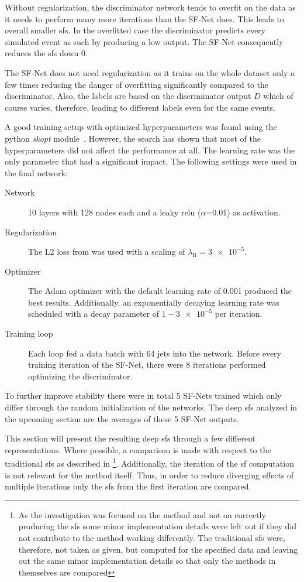 Without regularization, the discriminator network tends to overfit on the data as it needs to perform many more iterations than the SF-Net does. This leads to overall smaller \glspl{sf}. In the overfitted case the discriminator predicts every simulated event as such by producing a low output. The SF-Net consequently reduces the \glspl{sf} down 0.

The SF-Net does not need regularization as it trains on the whole dataset only a few times reducing the danger of overfitting significantly compared to the discriminator. Also, the labels are based on the discriminator output \(D\) which of course varies, therefore, leading to different labels even for the same events.

A good training setup with optimized hyperparameters was found using the python \emph{skopt} module~\cite{skopt}. However, the search has shown that most of the hyperparameters did not affect the performance at all. The learning rate was the only parameter that had a significant impact.
The following settings were used in the final network:
\begin{description}
    \item[Network] 10 layers with 128 nodes each and a leaky \gls{relu} (\(\alpha \)=0.01) as activation.
    \item[Regularization] The L2 loss from  was used with a scaling of \(\lambda_\text{R} = \num{3e-5}\).
    \item[Optimizer] The Adam optimizer with the default learning rate of 0.001 produced the best results. Additionally, an exponentially decaying learning rate was scheduled with a decay parameter of \(1-\num{3e-5}\) per iteration.
    \item[Training loop] Each loop fed a data batch with 64 jets into the network. Before every training iteration of the SF-Net, there were 8 iterations performed optimizing the discriminator.
\end{description}

To further improve stability there were in total 5 SF-Nets trained which only differ through the random initialization of the networks. The deep \glspl{sf} analyzed in the upcoming section are the averages of these 5 SF-Net outputs.


This section will present the resulting deep \glspl{sf} through a few different representations. Where possible, a comparison is made with respect to the traditional \glspl{sf} as described in \footnote{As the investigation was focused on the method and not on correctly producing the \glspl{sf} some minor implementation details were left out if they did not contribute to the method working differently. The traditional \glspl{sf} were, therefore, not taken as given, but computed for the specified data and leaving out the same minor implementation details so that only the methods in themselves are compared}. Additionally, the iteration of the \gls{sf} computation is not relevant for the method itself. Thus, in order to reduce diverging effects of multiple iterations only the \glspl{sf} from the first iteration are compared.

